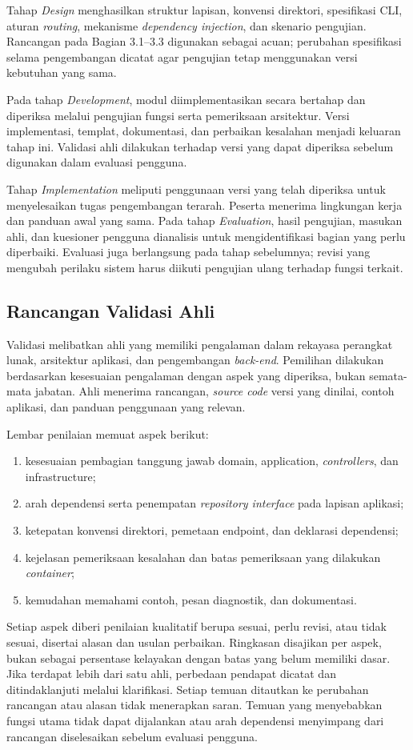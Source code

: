 \documentclass[12pt,a4paper,oneside]{report}
\begin{document}
Tahap \textit{Design} menghasilkan struktur lapisan, konvensi direktori, spesifikasi CLI, aturan \textit{routing}, mekanisme \textit{dependency injection}, dan skenario pengujian. Rancangan pada Bagian 3.1--3.3 digunakan sebagai acuan; perubahan spesifikasi selama pengembangan dicatat agar pengujian tetap menggunakan versi kebutuhan yang sama.

Pada tahap \textit{Development}, modul diimplementasikan secara bertahap dan diperiksa melalui pengujian fungsi serta pemeriksaan arsitektur. Versi implementasi, templat, dokumentasi, dan perbaikan kesalahan menjadi keluaran tahap ini. Validasi ahli dilakukan terhadap versi yang dapat diperiksa sebelum digunakan dalam evaluasi pengguna.

Tahap \textit{Implementation} meliputi penggunaan versi yang telah diperiksa untuk menyelesaikan tugas pengembangan terarah. Peserta menerima lingkungan kerja dan panduan awal yang sama. Pada tahap \textit{Evaluation}, hasil pengujian, masukan ahli, dan kuesioner pengguna dianalisis untuk mengidentifikasi bagian yang perlu diperbaiki. Evaluasi juga berlangsung pada tahap sebelumnya; revisi yang mengubah perilaku sistem harus diikuti pengujian ulang terhadap fungsi terkait.

\subsection{Rancangan Validasi Ahli}
Validasi melibatkan ahli yang memiliki pengalaman dalam rekayasa perangkat lunak, arsitektur aplikasi, dan pengembangan \textit{back-end}. Pemilihan dilakukan berdasarkan kesesuaian pengalaman dengan aspek yang diperiksa, bukan semata-mata jabatan. Ahli menerima rancangan, \textit{source code} versi yang dinilai, contoh aplikasi, dan panduan penggunaan yang relevan.

Lembar penilaian memuat aspek berikut:
\begin{enumerate}
\item kesesuaian pembagian tanggung jawab domain, application, \textit{controllers}, dan infrastructure;
\item arah dependensi serta penempatan \textit{repository interface} pada lapisan aplikasi;
\item ketepatan konvensi direktori, pemetaan endpoint, dan deklarasi dependensi;
\item kejelasan pemeriksaan kesalahan dan batas pemeriksaan yang dilakukan \textit{container};
\item kemudahan memahami contoh, pesan diagnostik, dan dokumentasi.
\end{enumerate}
Setiap aspek diberi penilaian kualitatif berupa sesuai, perlu revisi, atau tidak sesuai, disertai alasan dan usulan perbaikan. Ringkasan disajikan per aspek, bukan sebagai persentase kelayakan dengan batas yang belum memiliki dasar. Jika terdapat lebih dari satu ahli, perbedaan pendapat dicatat dan ditindaklanjuti melalui klarifikasi. Setiap temuan ditautkan ke perubahan rancangan atau alasan tidak menerapkan saran. Temuan yang menyebabkan fungsi utama tidak dapat dijalankan atau arah dependensi menyimpang dari rancangan diselesaikan sebelum evaluasi pengguna.
\end{document}
